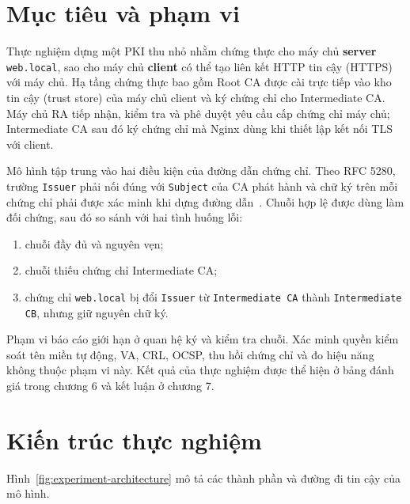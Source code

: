 \documentclass[11pt,a4paper]{article}
\begin{document}
\section{Mục tiêu và phạm vi}

Thực nghiệm dựng một PKI thu nhỏ nhằm chứng thực cho máy chủ \textbf{server}
\texttt{web.local}, sao cho máy chủ \textbf{client} có thể tạo liên kết
HTTP tin cậy (HTTPS) với máy chủ.
Hạ tầng chứng thực bao gồm Root CA được cài trực tiếp vào kho tin cậy
(trust store) của máy chủ client và ký chứng chỉ cho Intermediate CA.
Máy chủ RA tiếp nhận, kiểm tra và phê duyệt yêu cầu cấp chứng chỉ máy chủ;
Intermediate CA sau đó ký chứng chỉ mà Nginx dùng khi thiết lập kết nối TLS với client.

Mô hình tập trung vào hai điều kiện của đường dẫn chứng chỉ. Theo RFC
5280, trường \texttt{Issuer} phải nối đúng với \texttt{Subject} của CA
phát hành và chữ ký trên mỗi chứng chỉ phải được xác minh khi dựng
đường dẫn~\cite{RFC5280}. Chuỗi hợp lệ được dùng làm đối chứng, sau đó
so sánh với hai tình huống lỗi:

\begin{enumerate}
    \item chuỗi đầy đủ và nguyên vẹn;
    \item chuỗi thiếu chứng chỉ Intermediate CA;
    \item chứng chỉ \texttt{web.local} bị đổi
    \texttt{Issuer} từ \texttt{Intermediate CA} thành
    \texttt{Intermediate CB}, nhưng giữ nguyên chữ ký.
\end{enumerate}

Phạm vi báo cáo giới hạn ở quan hệ ký và kiểm tra chuỗi. Xác minh quyền
kiểm soát tên miền tự động, VA, CRL, OCSP, thu hồi chứng chỉ và đo hiệu
năng không thuộc phạm vi này. Kết quả của thực nghiệm được thể hiện ở bảng
đánh giá trong chương 6 và kết luận ở chương 7.

\section{Kiến trúc thực nghiệm}

Hình~\ref{fig:experiment-architecture} mô tả các thành phần và đường
đi tin cậy của mô hình.
\end{document}
